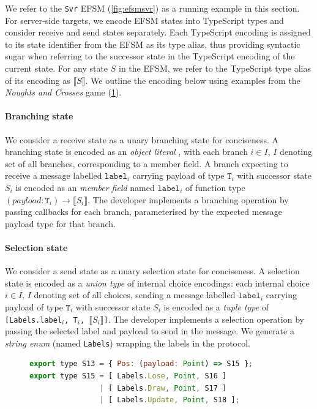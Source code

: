 We refer to the \texttt{Svr} EFSM (\cref{fig:efsmsvr}) as a running example in
this section.
For server-side targets, we encode EFSM states into TypeScript types and
consider receive and send states separately.
Each TypeScript encoding is assigned to its state identifier from the EFSM as
its type alias, thus providing syntactic sugar when referring to the successor
state in the TypeScript encoding of the current state.
For any state $S$ in the EFSM, we refer to the TypeScript type alias of its
encoding as $\llbracket S \rrbracket$. We outline the encoding below using examples from the
\textit{Noughts and Crosses} game (\cref{lst:svr}).

\paragraph{Branching state}
We consider a receive state as a unary branching state for conciseness.
A branching state is encoded as an \textit{object literal}
\cite{TypeScriptSpec}, with each branch $i \in I$, $I$ denoting set of all
branches, corresponding to a member field.
A branch expecting to receive a message labelled $\texttt{label}_i$ carrying
payload of type $\texttt{T}_i$ with successor state $S_i$ is encoded as an
\textit{member field} named $\texttt{label}_i$ of function type
$(payload:\texttt{T}_i) \to \llbracket S_i \rrbracket$.
The developer implements a branching operation by passing callbacks for each
branch, parameterised by the expected message payload type for that branch.

\paragraph{Selection state}
We consider a send state as a unary selection state for conciseness.
A selection state is encoded as a \textit{union type}
\cite{TypeScriptSpec} of internal choice encodings: each internal choice $i \in
I$, $I$ denoting set of all choices, sending a message labelled
$\texttt{label}_i$ carrying payload of type $\texttt{T}_i$ with successor state
$S_i$ is encoded as a \textit{tuple type} of \texttt{[Labels.label$_i$, T$_i$,
  $\llbracket S_i \rrbracket$]}.
The developer implements a selection operation by passing the selected label
and payload to send in the message.
We generate a \textit{string enum} (named \texttt{Labels}) wrapping the labels
in the protocol.

\begin{figure}[ht]
\begin{lstlisting}[language=JavaScript]
export type S13 = { Pos: (payload: Point) => S15 };
export type S15 = [ Labels.Lose, Point, S16 ]
                | [ Labels.Draw, Point, S17 ]
                | [ Labels.Update, Point, S18 ];
\end{lstlisting}
\label{lst:svr}
\end{figure}

